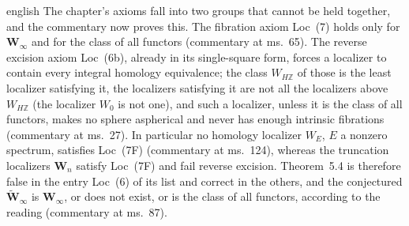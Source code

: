 \begin{otherlanguage*}{english}
The chapter's axioms fall into two groups that cannot be held together, and the commentary now proves this. The fibration axiom Loc~(7) holds only for $\mathbf W_\infty$ and for the class of all functors (commentary at ms.~65). The reverse excision axiom Loc~(6b), already in its single-square form, forces a localizer to contain every integral homology equivalence; the class $W_{H\mathbb Z}$ of those is the least localizer satisfying it, the localizers satisfying it are not all the localizers above $W_{H\mathbb Z}$ (the localizer $W_0$ is not one), and such a localizer, unless it is the class of all functors, makes no sphere aspherical and never has enough intrinsic fibrations (commentary at ms.~27). In particular no homology localizer $W_E$, $E$ a nonzero spectrum, satisfies Loc~(7F) (commentary at ms.~124), whereas the truncation localizers $\mathbf W_n$ satisfy Loc~(7F) and fail reverse excision. Theorem~5.4 is therefore false in the entry Loc~(6) of its list and correct in the others, and the conjectured $\widetilde{\mathbf W}_\infty$ is $\mathbf W_\infty$, or does not exist, or is the class of all functors, according to the reading (commentary at ms.~87).

\end{otherlanguage*}
